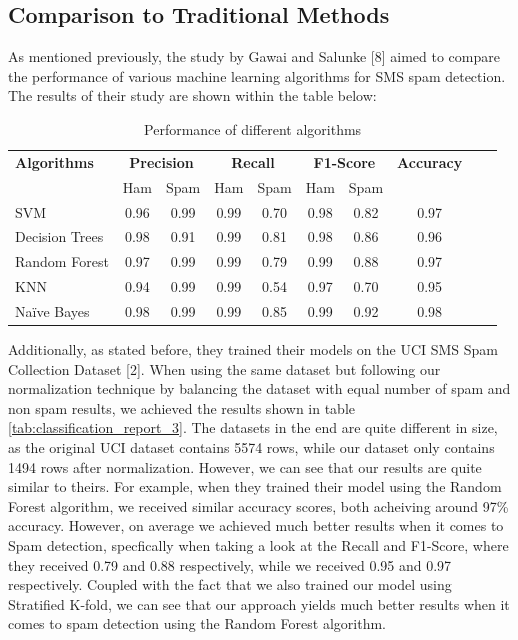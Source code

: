 \documentclass{article}
\begin{document}
\subsection{Comparison to Traditional Methods}

\noindent
As mentioned previously, the study by Gawai and Salunke [8] aimed to compare the performance of various machine learning algorithms for SMS spam detection. The results of their study are shown within the table below:

\begin{table}[htbp]
    \centering
    \caption{Performance of different algorithms} %
    \label{tab:performance} %
    
    \begin{tabular}{l cccc cccc c}
    \toprule
    \textbf{Algorithms} & \multicolumn{2}{c}{\textbf{Precision}} & \multicolumn{2}{c}{\textbf{Recall}} & \multicolumn{2}{c}{\textbf{F1-Score}} & \textbf{Accuracy} \\
    \cmidrule(lr){2-3} \cmidrule(lr){4-5} \cmidrule(lr){6-7}
    & Ham & Spam & Ham & Spam & Ham & Spam & \\
    \midrule
    SVM & 0.96 & 0.99 & 0.99 & 0.70 & 0.98 & 0.82 & 0.97 \\
    Decision Trees & 0.98 & 0.91 & 0.99 & 0.81 & 0.98 & 0.86 & 0.96 \\
    Random Forest & 0.97 & 0.99 & 0.99 & 0.79 & 0.99 & 0.88 & 0.97 \\
    KNN & 0.94 & 0.99 & 0.99 & 0.54 & 0.97 & 0.70 & 0.95 \\
    Naïve Bayes & 0.98 & 0.99 & 0.99 & 0.85 & 0.99 & 0.92 & 0.98 \\
    \bottomrule
    \end{tabular}
\end{table}

\noindent
Additionally, as stated before, they trained their models on the UCI SMS Spam Collection Dataset [2]. When using the same dataset but following our normalization technique by balancing the dataset with equal number of spam and non spam results, we achieved the results shown in table \ref{tab:classification_report_3}. The datasets in the end are quite different in size, as the original UCI dataset contains 5574 rows, while our dataset only contains 1494 rows after normalization. However, we can see that our results are quite similar to theirs. For example, when they trained their model using the Random Forest algorithm, we received similar accuracy scores, both acheiving around 97\% accuracy. However, on average we achieved much better results when it comes to Spam detection, specfically when taking a look at the Recall and F1-Score, where they received 0.79 and 0.88 respectively, while we received 0.95 and 0.97 respectively. Coupled with the fact that we also trained our model using Stratified K-fold, we can see that our approach yields much better results when it comes to spam detection using the Random Forest algorithm.
\newline
\end{document}
